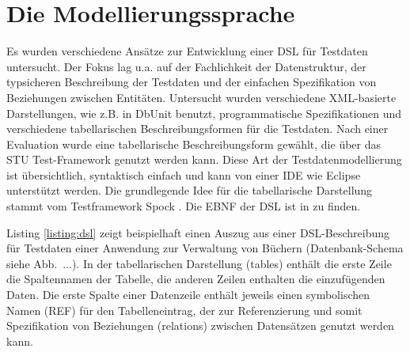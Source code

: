 \section{Die Modellierungssprache}


%
%

Es wurden verschiedene Ansätze zur Entwicklung einer DSL für Testdaten untersucht. Der Fokus lag u.a. auf der Fachlichkeit der Datenstruktur, der typsicheren Beschreibung der Testdaten und der einfachen Spezifikation von Beziehungen zwischen Entitäten. Untersucht wurden verschiedene XML-basierte Darstellungen, wie z.B. in DbUnit benutzt, programmatische Spezifikationen und verschiedene tabellarischen Beschreibungsformen für die Testdaten. 
%
Nach einer Evaluation wurde eine tabellarische Beschreibungsform gewählt, die über das STU Test-Framework genutzt werden kann. Diese Art der Testdatenmodellierung ist übersichtlich, syntaktisch einfach und kann von einer IDE wie Eclipse unterstützt werden. Die grundlegende Idee für die tabellarische Darstellung stammt vom Testframework Spock \cite{Spock}.
%
Die EBNF der DSL ist in \cite{MT:Moll:2013} zu finden.


Listing \ref{listing:dsl} zeigt beispielhaft einen Auszug aus einer DSL-Beschreibung für Testdaten einer Anwendung zur Verwaltung von Büchern (Datenbank-Schema siehe Abb.~...). In der tabellarischen Darstellung (tables) enthält die erste Zeile die Spaltennamen der Tabelle, die anderen Zeilen enthalten die einzufügenden Daten. Die erste Spalte einer Datenzeile enthält jeweils einen symbolischen Namen (REF) für den Tabelleneintrag, der zur Referenzierung und somit Spezifikation von Beziehungen (relations) zwischen Datensätzen genutzt werden kann.


